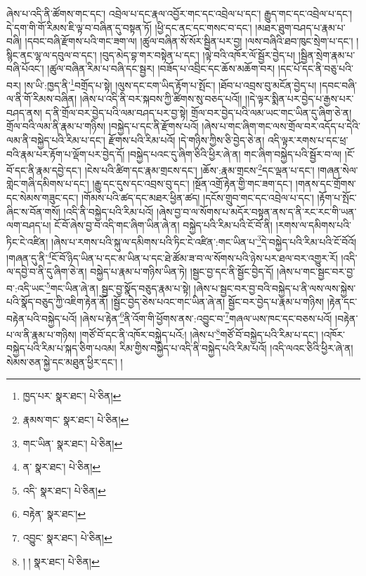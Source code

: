 ཞེས་པ་འདི་ནི་ཚོགས་གང་དང་། འབྲེལ་པ་དང་རྣལ་འབྱོར་གང་དང་འབྲེལ་པ་དང་། རྒྱུད་གང་དང་འབྲེལ་པ་དང་། དེ་དག་གི་གོ་རིམས་ཇི་ལྟ་བ་བཞིན་དུ་བསྟན་ཏོ། །ཕྱི་དང་ནང་དང་གསང་བ་དང་། །མཐར་ཐུག་བཤད་པ་རྣམ་པ་བཞི། །དབང་བཞི་རྫོགས་པའི་གང་ཟག་ལ། །ཚུལ་བཞིན་སོ་སོར་སྦྱིན་པར་བྱ། །ལས་བཞིའི་ཐབ་ཁུང་སྲེག་པ་དང་། །སྙིང་ནང་ལྷ་ལ་དབུལ་བ་དང་། །བུད་མེད་བྷ་གར་བསྟེན་པ་དང་། །ལྟེ་བའི་འཁོར་ལོ་སྦྱོར་བྱེད་པ། །སྦྱིན་སྲེག་རྣམ་པ་བཞི་པོའང་། །ཚུལ་བཞིན་རིམ་པ་བཞི་དང་སྦྱར། །བཟོད་པ་འབྲིང་དང་ཆོས་མཆོག་བར། །དང་པོ་དང་ནི་བཅུ་པའི་བར། །ས་ཡི་:ཁྱད་ནི་\footnote{ཁྱད་པར་  སྣར་ཐང་།  པེ་ཅིན། }བགྲོད་པ་སྟེ། །ལུས་དང་ངག་ཡིད་རྟོག་པ་སྤོང་། །ཐོབ་པ་འབྲས་བུ་མངོན་བྱེད་པ། །དབང་བཞི་ལ་ནི་གོ་རིམས་བཞིན། །ཞེས་པ་འདི་ནི་བར་སྐབས་ཀྱི་ཚིགས་སུ་བཅད་པའོ།། །།དེ་ལྟར་སྨིན་པར་བྱེད་པ་རྒྱས་པར་བཤད་ནས། ད་ནི་གྲོལ་བར་བྱེད་པའི་ལམ་བཤད་པར་བྱ་སྟེ། གྲོལ་བར་བྱེད་པའི་ལམ་ཡང་གང་ཡིན་དུ་ཞིག་ཅེ་ན། གྲོལ་བའི་ལམ་ནི་རྣམ་པ་གཉིས། །བསྐྱེད་པ་དང་ནི་རྫོགས་པའོ། །ཞེས་པ་གང་ཞིག་གང་ལས་གྲོལ་བར་འདོད་པ་དེའི་ལམ་ནི་བསྐྱེད་པའི་རིམ་པ་དང་། རྫོགས་པའི་རིམ་པའོ། །དེ་གཉིས་ཀྱིས་ཅི་བྱེད་ཅེ་ན། འདི་ལྟར་རགས་པ་དང་ཕྲ་བའི་རྣམ་པར་རྟོག་པ་ལྡོག་པར་བྱེད་དོ། །བསྐྱེད་པའང་དུ་ཞིག་ཅིའི་ཕྱིར་ཞེ་ན། གང་ཞིག་བསྐྱེད་པའི་སྦྱོར་བ་ལ། །ངོ་བོ་དང་ནི་རྣམ་དབྱེ་དང་། །ངེས་པའི་ཚིག་དང་རྣམ་གྲངས་དང་། །ཆོས་:རྣམ་གྲངས་\footnote{རྣམས་གང་  སྣར་ཐང་།  པེ་ཅིན། }དང་ལྡན་པ་དང་། །གཞན་སེལ་གླེང་གཞི་དམིགས་པ་དང་། །རྒྱུ་དང་དུས་དང་འབྲས་བུ་དང་། །སྔོན་འགྲོ་རྟེན་གྱི་གང་ཟག་དང་། །གནས་དང་གྲོགས་དང་སེམས་གཟུང་དང་། །གོམས་པའི་ཚད་དང་མཐར་ཕྱིན་ཚད། །དངོས་གྲུབ་གང་དང་འབྲེལ་པ་དང་། །རྟོག་པ་སྤོང་ཞིང་ས་བོན་གསོ། །འདི་ནི་བསྐྱེད་པའི་རིམ་པའོ། །ཞེས་བྱ་བ་ལ་སོགས་པ་མདོར་བསྟན་ནས་ད་ནི་རང་རང་གི་ཡན་ལག་བཤད་པ། ངོ་བོ་ཞེས་བྱ་བ་འདི་གང་ཞིག་ཡིན་ཞེ་ན། བསྐྱེད་པའི་རིམ་པའི་ངོ་བོ་ནི། །རགས་ལ་དམིགས་པའི་ཏིང་ངེ་འཛིན། །ཞེས་པ་རགས་པའི་སྐུ་ལ་དམིགས་པའི་ཏིང་ངེ་འཛིན་:གང་ཡིན་པ་\footnote{གང་ཡིན་  སྣར་ཐང་།  པེ་ཅིན། }དེ་བསྐྱེད་པའི་རིམ་པའི་ངོ་བོའོ། །གཞན་དུ་ནི་\footnote{ན་  སྣར་ཐང་།  པེ་ཅིན། }ངོ་བོ་ཉིད་ཡིན་པ་དང་མ་ཡིན་པ་དང་ཐེ་ཚོམ་ཟ་བ་ལ་སོགས་པའི་ཉེས་པར་ཐལ་བར་འགྱུར་རོ། །འདི་ལ་དབྱེ་བ་ནི་དུ་ཞིག་ཅེ་ན། བསྐྱེད་པ་རྣམ་པ་གཉིས་ཡིན་ཏེ། །སྦྱང་བྱ་དང་ནི་སྦྱོང་བྱེད་དོ། །ཞེས་པ་གང་སྦྱང་བར་བྱ་བ་:འདི་ཡང་\footnote{འདི་  སྣར་ཐང་།  པེ་ཅིན། }གང་ཡིན་ཞེ་ན། སྦྱང་བྱ་སྣོད་བཅུད་རྣམ་པ་སྟེ། །ཞེས་པ་སྦྱང་བར་བྱ་བའི་བསྐྱེད་པ་ནི་ལས་ལས་སྐྱེས་པའི་སྣོད་བཅུད་ཀྱི་འཇིག་རྟེན་ནོ། །སྦྱོང་བྱེད་ཅེས་པའང་གང་ཡིན་ཞེ་ན། སྦྱོང་བར་བྱེད་པ་རྣམ་པ་གཉིས། །རྟེན་དང་བརྟེན་པའི་བསྐྱེད་པའོ། །ཞེས་པ་རྟེན་\footnote{བརྟེན་  སྣར་ཐང་། }ནི་འོག་གི་ཕྱོགས་ནས་:འབྱུང་བ་\footnote{འབྱུང་  སྣར་ཐང་།  པེ་ཅིན། }གཞལ་ཡས་ཁང་དང་བཅས་པའོ། །བརྟེན་པ་ལ་ནི་རྣམ་པ་གཉིས། །གཙོ་བོ་དང་ནི་འཁོར་བསྐྱེད་པའོ:། །ཞེས་པ་\footnote{། །  སྣར་ཐང་།  པེ་ཅིན། }གཙོ་བོ་བསྐྱེད་པའི་རིམ་པ་དང་། །འཁོར་བསྐྱེད་པའི་རིམ་པ་སྐད་ཅིག་པའམ། རིམ་གྱིས་བསྐྱེད་པ་འདི་ནི་བསྐྱེད་པའི་རིམ་པའོ། །འདི་ལའང་ཅིའི་ཕྱིར་ཞེ་ན། སེམས་ཅན་སྐྱེ་དང་མཐུན་ཕྱིར་དང་། །
